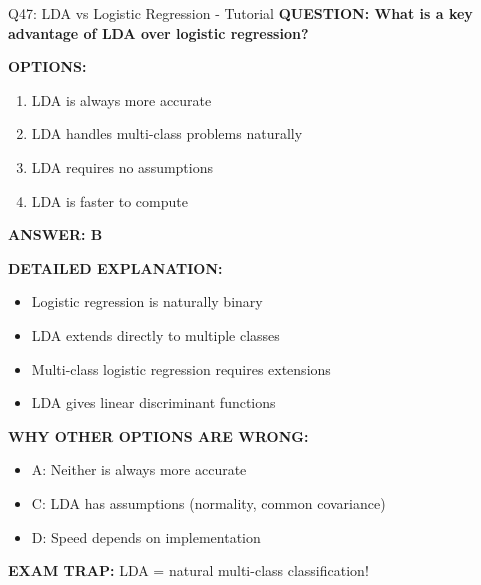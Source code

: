 \documentclass[8pt]{beamer}
\begin{document}
	\begin{frame}{Q47: LDA vs Logistic Regression - Tutorial}
		\fontsize{6.5}{7.5}\selectfont
		\textbf{QUESTION: What is a key advantage of LDA over logistic regression?}
		
		\vspace{0.1cm}
		\textbf{OPTIONS:}
		\begin{enumerate}
			\item LDA is always more accurate
			\item LDA handles multi-class problems naturally
			\item LDA requires no assumptions
			\item LDA is faster to compute
		\end{enumerate}
		
		\vspace{0.1cm}
		\textcolor{myblue}{\textbf{ANSWER: B}}
		
		\vspace{0.1cm}
		\textbf{DETAILED EXPLANATION:}
		\begin{itemize}
			\item Logistic regression is naturally binary
			\item LDA extends directly to multiple classes
			\item Multi-class logistic regression requires extensions
			\item LDA gives linear discriminant functions
		\end{itemize}
		
		\vspace{0.1cm}
		\textcolor{myred}{\textbf{WHY OTHER OPTIONS ARE WRONG:}}
		\begin{itemize}
			\item \textcolor{myred}{A:} Neither is always more accurate
			\item \textcolor{myred}{C:} LDA has assumptions (normality, common covariance)
			\item \textcolor{myred}{D:} Speed depends on implementation
		\end{itemize}
		
		\textcolor{myred}{\textbf{EXAM TRAP:}} LDA = \textcolor{myblue}{natural multi-class classification}!
	\end{frame}
	
\end{document}
